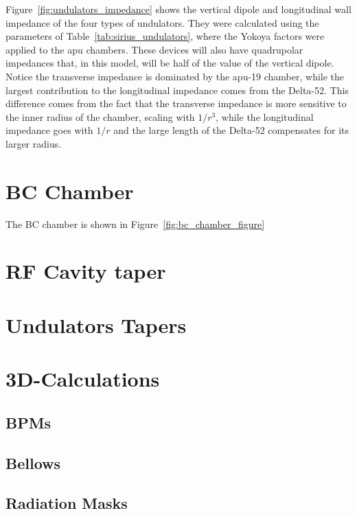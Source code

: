     Figure~\ref{fig:undulators_impedance} shows the vertical dipole and longitudinal wall impedance of the four types of undulators. They were calculated using the parameters of Table~\ref{tab:sirius_undulators}, where the Yokoya factors were applied to the \gls{apu} chambers. These devices will also have quadrupolar impedances that, in this model, will be half of the value of the vertical dipole. Notice the transverse impedance is dominated by the \gls{apu}-19 chamber, while the largest contribution to the longitudinal impedance comes from the Delta-52. This difference comes from the fact that the transverse impedance is more sensitive to the inner radius of the chamber, scaling with $1/r^3$, while the longitudinal impedance goes with $1/r$ and the large length of the Delta-52 compensates for its larger radius.

\section{BC Chamber}

    The BC chamber is shown in Figure~\ref{fig:bc_chamber_figure}


\section{RF Cavity taper}

\section{Undulators Tapers}

\section{3D-Calculations}
\subsection{BPMs}
\subsection{Bellows}
\subsection{Radiation Masks}


